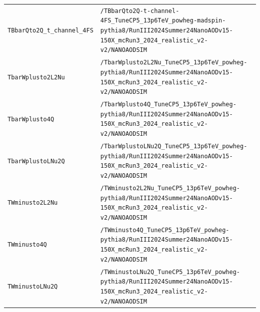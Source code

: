 \begin{longtable}{@{}>{\RaggedRight\arraybackslash}p{} >{\RaggedRight\arraybackslash}p{}@{}}
\addlinespace[2pt]
\texttt{TBbarQto2Q\_\allowbreak{}t\_\allowbreak{}channel\_\allowbreak{}4FS} & \texttt{/\allowbreak{}TBbarQto2Q-\allowbreak{}t-\allowbreak{}channel-\allowbreak{}4FS\_\allowbreak{}TuneCP5\_\allowbreak{}13p6TeV\_\allowbreak{}powheg-\allowbreak{}madspin-\allowbreak{}pythia8/\allowbreak{}RunIII2024Summer24NanoAODv15-\allowbreak{}150X\_\allowbreak{}mcRun3\_\allowbreak{}2024\_\allowbreak{}realistic\_\allowbreak{}v2-\allowbreak{}v2/\allowbreak{}NANOAODSIM} \\
\addlinespace[2pt]
\texttt{TbarWplusto2L2Nu} & \texttt{/\allowbreak{}TbarWplusto2L2Nu\_\allowbreak{}TuneCP5\_\allowbreak{}13p6TeV\_\allowbreak{}powheg-\allowbreak{}pythia8/\allowbreak{}RunIII2024Summer24NanoAODv15-\allowbreak{}150X\_\allowbreak{}mcRun3\_\allowbreak{}2024\_\allowbreak{}realistic\_\allowbreak{}v2-\allowbreak{}v2/\allowbreak{}NANOAODSIM} \\
\addlinespace[2pt]
\texttt{TbarWplusto4Q} & \texttt{/\allowbreak{}TbarWplusto4Q\_\allowbreak{}TuneCP5\_\allowbreak{}13p6TeV\_\allowbreak{}powheg-\allowbreak{}pythia8/\allowbreak{}RunIII2024Summer24NanoAODv15-\allowbreak{}150X\_\allowbreak{}mcRun3\_\allowbreak{}2024\_\allowbreak{}realistic\_\allowbreak{}v2-\allowbreak{}v2/\allowbreak{}NANOAODSIM} \\
\addlinespace[2pt]
\texttt{TbarWplustoLNu2Q} & \texttt{/\allowbreak{}TbarWplustoLNu2Q\_\allowbreak{}TuneCP5\_\allowbreak{}13p6TeV\_\allowbreak{}powheg-\allowbreak{}pythia8/\allowbreak{}RunIII2024Summer24NanoAODv15-\allowbreak{}150X\_\allowbreak{}mcRun3\_\allowbreak{}2024\_\allowbreak{}realistic\_\allowbreak{}v2-\allowbreak{}v2/\allowbreak{}NANOAODSIM} \\
\addlinespace[2pt]
\texttt{TWminusto2L2Nu} & \texttt{/\allowbreak{}TWminusto2L2Nu\_\allowbreak{}TuneCP5\_\allowbreak{}13p6TeV\_\allowbreak{}powheg-\allowbreak{}pythia8/\allowbreak{}RunIII2024Summer24NanoAODv15-\allowbreak{}150X\_\allowbreak{}mcRun3\_\allowbreak{}2024\_\allowbreak{}realistic\_\allowbreak{}v2-\allowbreak{}v2/\allowbreak{}NANOAODSIM} \\
\addlinespace[2pt]
\texttt{TWminusto4Q} & \texttt{/\allowbreak{}TWminusto4Q\_\allowbreak{}TuneCP5\_\allowbreak{}13p6TeV\_\allowbreak{}powheg-\allowbreak{}pythia8/\allowbreak{}RunIII2024Summer24NanoAODv15-\allowbreak{}150X\_\allowbreak{}mcRun3\_\allowbreak{}2024\_\allowbreak{}realistic\_\allowbreak{}v2-\allowbreak{}v2/\allowbreak{}NANOAODSIM} \\
\addlinespace[2pt]
\texttt{TWminustoLNu2Q} & \texttt{/\allowbreak{}TWminustoLNu2Q\_\allowbreak{}TuneCP5\_\allowbreak{}13p6TeV\_\allowbreak{}powheg-\allowbreak{}pythia8/\allowbreak{}RunIII2024Summer24NanoAODv15-\allowbreak{}150X\_\allowbreak{}mcRun3\_\allowbreak{}2024\_\allowbreak{}realistic\_\allowbreak{}v2-\allowbreak{}v2/\allowbreak{}NANOAODSIM} \\

\end{longtable}
